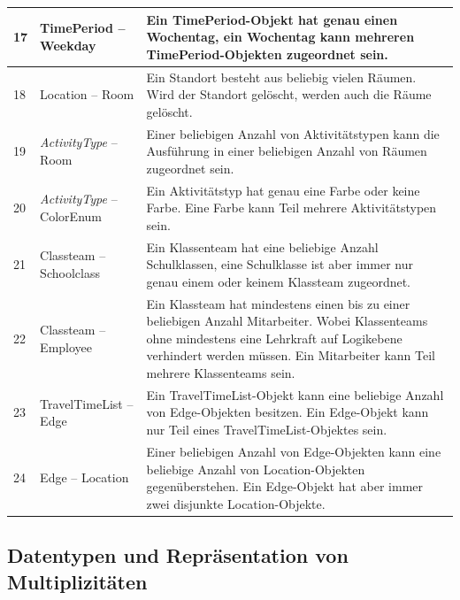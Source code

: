 \documentclass[fontsize=12pt,paper=a4,twoside]{scrartcl}
\begin{document}
\begin{tabularx}{\textwidth}{|p{0.6cm}|p{5cm}|X|}
\hline
17 	& TimePeriod -- Weekday & Ein TimePeriod-Objekt hat genau einen Wochentag, ein Wochentag kann 
	mehreren TimePeriod-Objekten zugeordnet sein.\\\hline 
18	& Location -- Room						& Ein Standort besteht aus beliebig vielen Räumen. 
	Wird der Standort gelöscht, werden auch die Räume gelöscht.\\\hline
19	& \textit{ActivityType} -- Room					& Einer beliebigen Anzahl von Aktivitätstypen
	kann die Ausführung in einer beliebigen Anzahl von Räumen zugeordnet sein. \\\hline
20	& \textit{ActivityType} -- ColorEnum 		& Ein Aktivitätstyp hat genau eine Farbe oder keine 
	Farbe. Eine Farbe kann Teil mehrere Aktivitätstypen sein.\\\hline
21	& Classteam -- Schoolclass 					& Ein Klassenteam hat eine beliebige Anzahl 
	Schulklassen, eine Schulklasse ist aber immer nur genau einem oder keinem Klassteam zugeordnet.\\\hline
22	& Classteam -- Employee 					& Ein Klassteam hat mindestens einen bis zu 
	einer beliebigen Anzahl Mitarbeiter. Wobei Klassenteams ohne mindestens eine Lehrkraft auf Logikebene verhindert werden müssen. Ein Mitarbeiter kann Teil mehrere Klassenteams sein. \\\hline
23	& TravelTimeList -- Edge 					& Ein TravelTimeList-Objekt kann eine beliebige
	Anzahl von Edge-Objekten besitzen. Ein Edge-Objekt kann nur Teil eines TravelTimeList-Objektes sein. \\\hline
24	& Edge -- Location							& Einer beliebigen Anzahl von Edge-Objekten kann 
	eine beliebige Anzahl von Location-Objekten gegenüberstehen. Ein Edge-Objekt hat aber immer zwei disjunkte Location-Objekte.\\\hline 
\end{tabularx}
\subsection{Datentypen und Repräsentation von Multiplizitäten}
\end{document}
